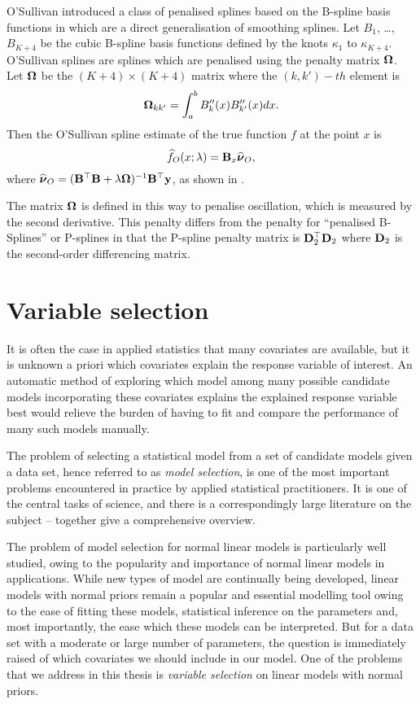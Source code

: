 O'Sullivan introduced a class of penalised splines based on the B-spline basis
functions in \cite{OSullivan1986} which are a direct generalisation of
smoothing splines. Let $B_1$, \ldots, $B_{K+4}$ be the cubic B-spline basis
functions defined by the knots $\kappa_1$ to $\kappa_{K+4}$. O'Sullivan splines
are splines which are penalised using the penalty matrix ${\boldsymbol \Omega}$. Let
${\boldsymbol \Omega}$ be the $(K+4) \times (K+4)$ matrix where the $(k, k')-th$ element is
\[ {\boldsymbol \Omega}_{k k'} = \int_a^b B''_k(x) B''_{k'}(x) dx. \] Then the O'Sullivan
spline estimate of the true function $f$ at the point $x$ is
\begin{equation*}
\widehat{f}_O(x; \lambda) = {\bf B}_x \widehat{{\boldsymbol \nu}}_O,
\end{equation*}
where $\widehat{{\boldsymbol \nu}}_O = ({\bf B}^\top {\bf B} + \lambda {\boldsymbol\Omega})^{-1} {\bf B}^\top {\bf y}$,
as shown in \cite{ruppert_wand_carroll_2003}.

The matrix ${\boldsymbol \Omega}$ is defined in this way to penalise oscillation, which is
measured by the second derivative. This penalty differs from the penalty for
``penalised B-Splines'' or P-splines in that the P-spline penalty matrix is
${\bf D}_2^\top {\bf D}_2$ where ${\bf D}_2$ is the second-order differencing matrix.

\section{Variable selection}

It is often the case in applied statistics that many covariates are available,
but it is unknown a priori which covariates explain the response variable of
interest. An automatic method of exploring which model among many possible
candidate models incorporating these covariates explains the explained response
variable best would relieve the burden of having to fit and compare the
performance of many such models manually.

The problem of selecting a statistical model from a set of candidate models
given a data set, hence referred to as \emph{model selection}, is one of the
most important problems encountered in practice by applied statistical
practitioners. It is one of the central tasks of science, and there is a
correspondingly large literature on the subject -- \cite{Claeskens:1251912,
NengjunYi2013, Johnstone2009} together give a comprehensive overview.

The problem of model selection for normal linear models is particularly well
studied, owing to the popularity and importance of normal linear models in
applications. While new types of model are continually being developed, linear
models with normal priors remain a popular and essential modelling tool owing to
the ease of fitting these models, statistical inference on the parameters and,
most importantly, the ease which these models can be interpreted. But for a data
set with a moderate or large number of parameters, the question is immediately
raised of which covariates we should include in our model. One of the problems
that we address in this thesis is \emph{variable selection} on linear models
with normal priors.

